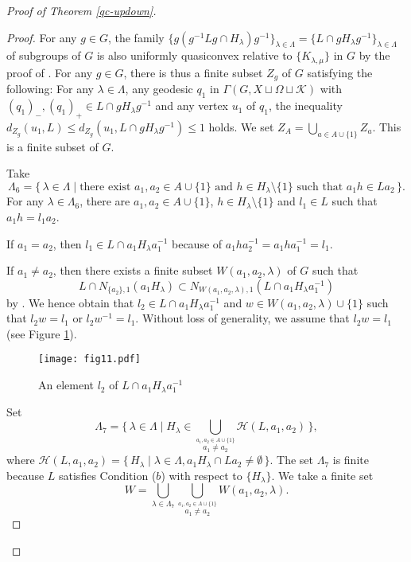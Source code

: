 \documentclass{amsart}
\theoremstyle{definition}
\begin{document}
\begin{proof}[Proof of Theorem \ref{qc-updown}]
\begin{proof}
For any $g\in G$, the family $\{g(g^{-1} L g \cap H_\lambda) g^{-1}\}_{\lambda\in \Lambda}=\{L\cap g H_\lambda g^{-1}\}_{\lambda\in\Lambda}$ of subgroups of $G$ is also uniformly quasiconvex relative to $\{K_{\lambda,\mu}\}$ in $G$ by the proof of \cite[Lemma 4.16 and Theorem 1.4 (i)]{M-O-Y1}. 
For any $g \in G$, there is thus a finite subset $Z_g$ of $G$ satisfying the following:
For any $\lambda\in\Lambda$, any geodesic $q_1$ in $\Gamma(G,X\sqcup\Omega\sqcup {\mathcal K})$ with $(q_1)_-,(q_1)_+ \in L\cap g H_\lambda g^{-1}$ and any vertex $u_1$ of $q_1$, the inequality $d_{Z_{g}}(u_1, L)\leq d_{Z_{g}}(u_1, L\cap gH_\lambda g^{-1})\leq 1$ holds. 
We set $Z_A=\bigcup_{a\in A\cup \{1\}} Z_{a}$. 
This is a finite subset of $G$. 

Take 
$$
\Lambda_6=\{\, \lambda\in\Lambda \mid \text{there exist }a_1,a_2 \in A \cup \{1\} \text{ and } h\in H_\lambda \setminus \{1\} \text{ such that }a_1 h \in L a_2  \,\}.
$$  
For any $\lambda\in\Lambda_6$, there are $a_1,a_2 \in A \cup \{1\}$, $h\in H_\lambda\setminus \{1\}$ and $l_1\in L$ such that $a_1 h=l_1a_2$. 

If $a_1=a_2$, then $l_1\in L\cap a_1 H_\lambda a_1^{-1}$ because of $a_1 h a_2^{-1}=a_1h a_1^{-1}=l_1$. 

If $a_1\ne a_2$, then there exists a finite subset $W(a_1,a_2,\lambda)$ of $G$ such that 
$$
L\cap N_{\{a_2\},1}(a_1 H_\lambda)\subset N_{W(a_1,a_2,\lambda),1}(L\cap a_1 H_\lambda a_1^{-1})
$$ 
by \cite[Lemma 4.22]{M-O-Y1}. 
We hence obtain that $l_2\in L\cap a_1 H_\lambda a_1^{-1}$ and $w \in W(a_1,a_2,\lambda)\cup \{1\}$ such that $l_2 w=l_1$ or $l_2w^{-1}=l_1$. 
Without loss of generality, we assume that $l_2 w=l_1$ (see Figure \ref{fig11}). 

\begin{figure}[top]
\begin{center}
\texttt{[image: fig11.pdf]}
\end{center}
\caption{An element $l_2$ of $L\cap a_1 H_\lambda a_1^{-1}$}
\label{fig11}
\end{figure}

Set 
$$
\Lambda_7=\{\, \lambda\in\Lambda \mid H_\lambda\in \bigcup_{\stackrel{a_1, a_2 \in A \cup \{1\}}{a_1 \ne a_2}}{\mathscr{H}}(L,a_1,a_2)\,\},
$$ 
where ${\mathscr{H}}(L,a_1,a_2)=\{\, H_\lambda \mid \lambda\in \Lambda, a_1 H_\lambda \cap L a_2 \ne \emptyset\,\}$. 
The set $\Lambda_7$ is finite because $L$ satisfies Condition ($b$) with respect to $\{H_\lambda\}$. 
We take a finite set 
$$
W=\bigcup_{\lambda\in \Lambda_7}\bigcup_{\stackrel{a_1,a_2\in A\cup \{1\}}{a_1\ne a_2}}W(a_1,a_2,\lambda).
$$ 


\end{proof}
\end{proof}
\end{document}
